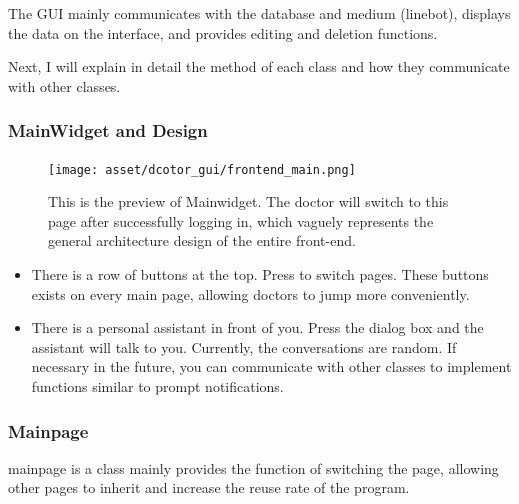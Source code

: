 \documentclass{article}
\begin{document}
The GUI mainly communicates with the database and medium (linebot), displays the data on the interface, and provides editing and deletion functions. 

Next, I will explain in detail the method of each class and how they communicate with other classes.

\subsubsection*{MainWidget and Design}
\begin{figure}[h]
    \centering
    \texttt{[image: asset/dcotor\_gui/frontend\_main.png]}
    \caption{This is the preview of Mainwidget. The doctor will switch to this page after successfully logging in, which vaguely represents the general architecture design of the entire front-end.}
    \label{fig:frontend_main}
\end{figure}
\begin{itemize}
    \item There is a row of buttons at the top. Press to switch pages. These buttons exists on every main page, allowing doctors to jump more conveniently.
    \item There is a personal assistant in front of you. Press the dialog box and the assistant will talk to you. Currently, the conversations are random. If necessary in the future, you can communicate with other classes to implement functions similar to prompt notifications.
\end{itemize}

\subsubsection*{Mainpage}
mainpage is a class mainly provides the function of switching the page, allowing other pages to inherit and increase the reuse rate of the program.
\end{document}
